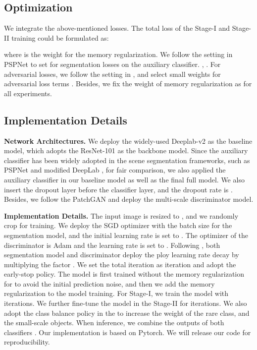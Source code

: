 \documentclass{article}
\begin{document}
\subsection{Optimization}
We integrate the above-mentioned losses. The total loss of the Stage-I and Stage-II training could be formulated as:

where  is the weight for the memory regularization. We follow the setting in PSPNet \cite{zhao2017pyramid} to set  for segmentation losses on the auxiliary classifier. , . For adversarial losses, we follow the setting in \cite{tsai2018learning,luo2019taking}, and select small weights for adversarial loss terms . Besides, we fix the weight of memory regularization as  for all experiments.

\subsection{Implementation Details}
\textbf{Network Architectures.} We deploy the widely-used Deeplab-v2 \cite{chen2017deeplab} as the baseline model, which adopts the ResNet-101 \cite{he2016deep} as the backbone model. Since the auxiliary classifier has been widely adopted in the scene segmentation frameworks, such as PSPNet \cite{zhao2017pyramid} and modified DeepLab \cite{tsai2018learning,luo2019taking}, for fair comparison, we also applied the auxiliary classifier in our baseline model as well as the final full model. We also insert the dropout layer before the classifier layer, and the dropout rate is .
Besides, we follow the PatchGAN \cite{isola2017image} and deploy the multi-scale discriminator model.

\noindent\textbf{Implementation Details.}  The input image is resized to , and we randomly crop  for training. We deploy the SGD optimizer with the batch size  for the segmentation model, and the initial learning rate is set to . The optimizer of the discriminator is Adam and the learning rate is set to . Following \cite{zhao2017pyramid,zhang2019dual}, both segmentation model and discriminator deploy the ploy learning rate decay by multiplying the factor . We set the total iteration as  iteration and adopt the early-stop policy.
The model is first trained without the memory regularization for  to avoid the initial prediction noise, and then we add the memory regularization to the model training. For Stage-I, we train the model with  iterations. We further fine-tune the model in the Stage-II for  iterations. 
We also adopt the class balance policy in the \cite{zou2018unsupervised} to increase the weight of the rare class, and the small-scale objects.  When inference, we combine the outputs of both classifiers . Our implementation is based on Pytorch. We will release our code for reproducibility. 
\end{document}
